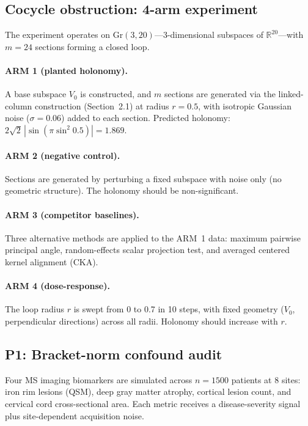\documentclass[11pt]{article}
\newcommand{\Gr}{\mathrm{Gr}}
\newcommand{\R}{\mathbb{R}}
\begin{document}
\subsection{Cocycle obstruction: 4-arm experiment}

The experiment operates on $\Gr(3, 20)$---3-dimensional subspaces of
$\R^{20}$---with $m = 24$ sections forming a closed loop.

\paragraph{ARM 1 (planted holonomy).}
A base subspace $V_0$ is constructed, and $m$ sections are generated via
the linked-column construction (Section~2.1) at radius $r = 0.5$, with
isotropic Gaussian noise ($\sigma = 0.06$) added to each section.
Predicted holonomy: $2\sqrt{2}\,|\sin(\pi \sin^2 0.5)| = 1.869$.

\paragraph{ARM 2 (negative control).}
Sections are generated by perturbing a fixed subspace with noise only
(no geometric structure). The holonomy should be non-significant.

\paragraph{ARM 3 (competitor baselines).}
Three alternative methods are applied to the ARM~1 data: maximum
pairwise principal angle, random-effects scalar projection test, and
averaged centered kernel alignment (CKA).

\paragraph{ARM 4 (dose-response).}
The loop radius $r$ is swept from 0 to 0.7 in 10 steps, with fixed
geometry ($V_0$, perpendicular directions) across all radii. Holonomy
should increase with $r$.

\subsection{P1: Bracket-norm confound audit}

Four MS imaging biomarkers are simulated across $n = 1500$ patients at
8 sites: iron rim lesions (QSM), deep gray matter atrophy, cortical
lesion count, and cervical cord cross-sectional area. Each metric
receives a disease-severity signal plus site-dependent acquisition noise.
\end{document}
